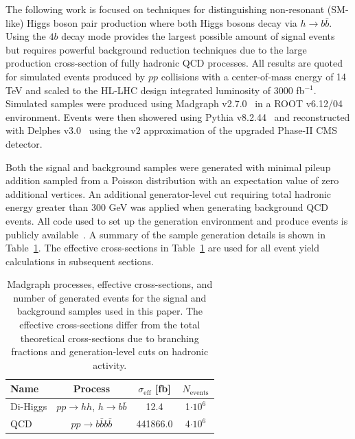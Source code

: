 The following work is focused on techniques for distinguishing non-resonant (SM-like) Higgs boson pair production where both Higgs bosons decay via $h \to b \bar{b}$. Using the $4b$ decay mode provides the largest possible amount of signal events but requires powerful background reduction techniques due to the large production cross-section of fully hadronic QCD processes. All results are quoted for simulated events produced by $pp$ collisions with a center-of-mass energy of 14 TeV and scaled to the HL-LHC design integrated luminosity of 3000 fb$^{-1}$. Simulated samples were produced using Madgraph v2.7.0~\cite{Alwall:2014hca} in a ROOT v6.12/04~\cite{Brun:1997pa} environment. Events were then showered using Pythia v8.2.44~\cite{Sj_strand_2015} and reconstructed with Delphes v3.0~\cite{de_Favereau_2014} using the v2 approximation of the upgraded Phase-II CMS detector.

Both the signal and background samples were generated with minimal pileup addition sampled from a Poisson distribution with an expectation value of zero additional vertices. An additional generator-level cut requiring total hadronic energy greater than 300 GeV was applied when generating background QCD events. All code used to set up the generation environment and produce events is publicly available~\cite{github}. A summary of the sample generation details is shown in Table~\ref{tab:samples}. The effective cross-sections in Table~\ref{tab:samples} are used for all event yield calculations in subsequent sections.

\begin{table}[ht!]
 \label{tab:samples}
\centering
    \begin{tabular}{|l|c|c|c|} %
      \hline\hline
      Name & Process & $\sigma_{\textrm{eff}}$ [fb] & $N_{\textrm{events}}$ \\
      \hline
      Di-Higgs & $p p \rightarrow h h$, $h \rightarrow b \bar{b}$ & 12.4 & 1$\cdot 10^6$ \\
      QCD     & $p p \rightarrow b \bar{b} b \bar{b}$ & 441866.0 & 4$\cdot 10^6$ \\
      \hline\hline
    \end{tabular}
\caption{Madgraph processes, effective cross-sections, and number of generated events for the signal and background samples used in this paper. The effective cross-sections differ from the total theoretical cross-sections due to branching fractions and generation-level cuts on hadronic activity.}
\end{table}

